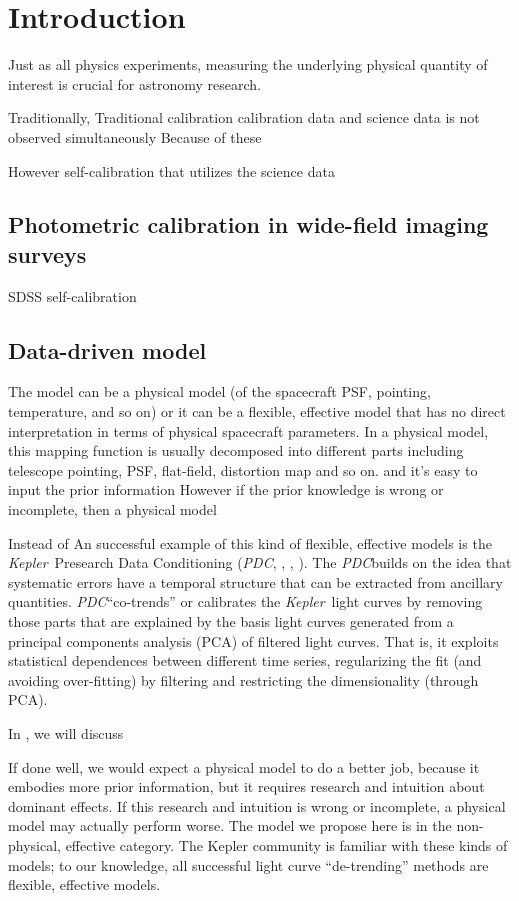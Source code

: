 \documentclass[12pt, preprint]{aastex}
\newcommand{\project}[1]{\textsl{#1}}
\newcommand{\kepler}{\project{Kepler}}
\newcommand{\pdc}{\project{PDC}}
\begin{document}
\section{Introduction}
Just as all physics experiments, measuring the underlying physical quantity of interest is crucial for astronomy research.

Traditionally, 
Traditional calibration
calibration data and science data is not observed simultaneously
Because of these 

However self-calibration that utilizes the science data

\subsection{Photometric calibration in wide-field imaging surveys}
SDSS self-calibration 

\subsection{Data-driven model}
The model can be a physical model (of the spacecraft PSF, pointing, temperature, and so on) or it can be a flexible, effective model that has no direct interpretation in terms of physical spacecraft parameters.
In a physical model, this mapping function is usually decomposed into different parts including telescope pointing, PSF, flat-field, distortion map and so on.
 and it's easy to input the prior information 
However if the prior knowledge is wrong or incomplete, then a physical model 

Instead of 
An successful example of this kind of flexible, effective models is the \kepler\ Presearch Data Conditioning (\pdc, \citealt{pdc1}, \citealt{pdc2}, \citealt{pdc3}). 
The \pdc builds on the idea that systematic errors have a temporal structure that can be extracted from ancillary quantities.
\pdc ``co-trends'' or calibrates the \kepler\ light curves by removing those parts that are explained by the basis light curves generated from a principal components analysis (PCA) of filtered light curves.
That is, it exploits statistical dependences between different time series, regularizing the fit (and avoiding over-fitting) by filtering and restricting the dimensionality (through PCA).

In , we will discuss  

If done well, we would expect a physical model to do a better job, because it embodies more prior information, but it requires research and intuition about dominant effects. 
If this research and intuition is wrong or incomplete, a physical model may actually perform worse. The model we propose here is in the non-physical, effective category. The Kepler community is familiar with these kinds of models; to our knowledge, all successful light curve “de-trending” methods are flexible, effective models.
\end{document}
